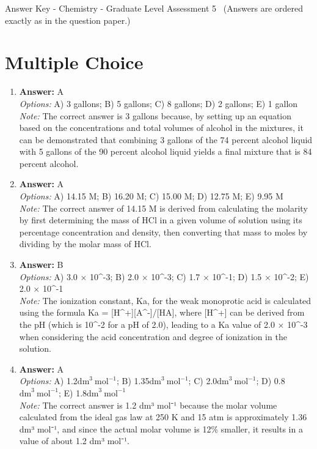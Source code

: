 \documentclass[12pt]{article}
\begin{document}
\begin{center}
Answer Key - Chemistry - Graduate Level Assessment 5 \
\small (Answers are ordered exactly as in the question paper.)
\end{center}

\section*{Multiple Choice}
\begin{enumerate}[label=\arabic*.]
\item \textbf{Answer:} A
\\ \textit{Options:} A) 3 gallons; B) 5 gallons; C) 8 gallons; D) 2 gallons; E) 1 gallon
\\ \textit{Note:} The correct answer is 3 gallons because, by setting up an equation based on the concentrations and total volumes of alcohol in the mixtures, it can be demonstrated that combining 3 gallons of the 74 percent alcohol liquid with 5 gallons of the 90 percent alcohol liquid yields a final mixture that is 84 percent alcohol.
\item \textbf{Answer:} A
\\ \textit{Options:} A) 14.15 M; B) 16.20 M; C) 15.00 M; D) 12.75 M; E) 9.95 M
\\ \textit{Note:} The correct answer of 14.15 M is derived from calculating the molarity by first determining the mass of HCl in a given volume of solution using its percentage concentration and density, then converting that mass to moles by dividing by the molar mass of HCl.
\item \textbf{Answer:} B
\\ \textit{Options:} A) 3.0 \ensuremath{\times} 10^-3; B) 2.0 \ensuremath{\times} 10^-3; C) 1.7 \ensuremath{\times} 10^-1; D) 1.5 \ensuremath{\times} 10^-2; E) 2.0 \ensuremath{\times} 10^-1
\\ \textit{Note:} The ionization constant, Ka, for the weak monoprotic acid is calculated using the formula Ka = [H^+][A^-]/[HA], where [H^+] can be derived from the pH (which is 10^-2 for a pH of 2.0), leading to a Ka value of 2.0 × 10^-3 when considering the acid concentration and degree of ionization in the solution.
\item \textbf{Answer:} A
\\ \textit{Options:} A) 1.2$\mathrm{dm}^3 \mathrm{~mol}^{-1}$; B) 1.35$\mathrm{dm}^3 \mathrm{~mol}^{-1}$; C) 2.0$\mathrm{dm}^3 \mathrm{~mol}^{-1}$; D) 0.8$\mathrm{dm}^3 \mathrm{~mol}^{-1}$; E) 1.8$\mathrm{dm}^3 \mathrm{~mol}^{-1}$
\\ \textit{Note:} The correct answer is 1.2 dm³ mol⁻¹ because the molar volume calculated from the ideal gas law at 250 K and 15 atm is approximately 1.36 dm³ mol⁻¹, and since the actual molar volume is 12\% smaller, it results in a value of about 1.2 dm³ mol⁻¹.

\end{enumerate}
\end{document}
